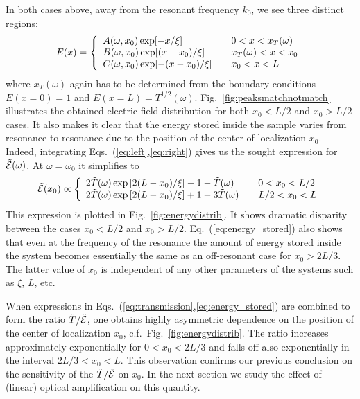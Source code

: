 In both cases above, away from the resonant frequency $k_0$, we see three distinct regions:
\begin{equation}
E(x) = \left\{
\begin{array}{l l}
A(\omega,x_0) \exp[- x     /\xi]  &\quad 0 < x < x_T(\omega)    \\
B(\omega,x_0) \exp[ (x-x_0)/\xi]  &\quad x_T(\omega) < x < x_0  \\
C(\omega,x_0) \exp[-(x-x_0)/\xi]  &\quad x_0 < x < L    \\
\end{array} \right. 
\label{eq:startingequations}
\end{equation}
where $x_T(\omega)$ again has to be determined from the boundary conditions $E(x=0)=1$ and $E(x=L)=T^{1/2}(\omega)$. Fig.~\ref{fig:peaksmatchnotmatch} illustrates the obtained electric field distribution for both $x_0<L/2$ and $x_0>L/2$ cases. It also makes it clear that the energy stored inside the sample varies from resonance to resonance due to the position of the center of localization $x_0$. Indeed, integrating Eqs.~(\ref{eq:left},\ref{eq:right}) gives us the sought expression for $\tilde{\cal E}(\omega)$. At $\omega=\omega_0$ it simplifies to
\begin{equation}
\tilde{\cal E}(x_0)\propto\left\{
\begin{array}{l l}
2\tilde{T}(\omega)\exp\left[2(L-x_0)/\xi\right]-1- \tilde{T}(\omega) & \quad 0  < x_0 < L/2 \\
2\tilde{T}(\omega)\exp\left[2(L-x_0)/\xi\right]+1-3\tilde{T}(\omega) & \quad L/2< x_0 < L   \\
\end{array}
\right.
\label{eq:energy_stored}
\end{equation}
This expression is plotted in Fig.~\ref{fig:energydistrib}. It shows dramatic disparity between the cases $x_0<L/2$ and $x_0>L/2$. Eq.~(\ref{eq:energy_stored}) also shows that even at the frequency of the resonance the amount of energy stored inside the system becomes essentially the same as an off-resonant case for $x_0>2L/3$. The latter value of $x_0$ is independent of any other parameters of the systems such as $\xi$, $L$, etc.

When expressions in Eqs.~(\ref{eq:transmission},\ref{eq:energy_stored}) are combined to form the ratio $\tilde{T}/\tilde{\cal E}$, one obtains highly asymmetric dependence on the position of the center of localization $x_0$, c.f.~Fig.~\ref{fig:energydistrib}. The ratio increases approximately exponentially for $0<x_0<2L/3$ and falls off also exponentially in the interval $2L/3<x_0<L$. This observation confirms our previous conclusion on the sensitivity of the $\tilde{T}/\tilde{\cal E}$ on $x_0$. In the next section we study the effect of (linear) optical amplification on this quantity.

